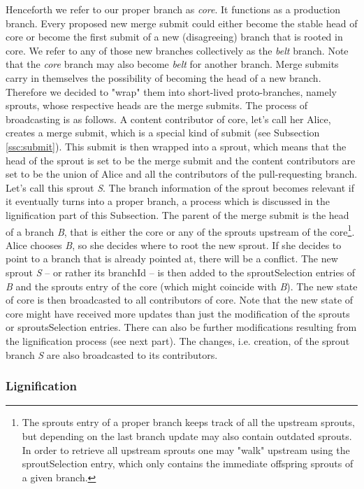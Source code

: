 Henceforth we refer to our proper branch as \textit{core}. It functions as a production branch. Every proposed new merge submit could either become the stable head of core or become the first submit of a new (disagreeing) branch that is rooted in core. We refer to any of those new branches collectively as the \textit{belt} branch. Note that the \textit{core} branch may also become \textit{belt} for another branch. Merge submits carry in themselves the possibility of becoming the head of a new branch. Therefore we decided to "wrap" them into short-lived proto-branches, namely sprouts, whose respective heads are the merge submits. The process of broadcasting is as follows. A content contributor of core, let's call her Alice, creates a merge submit, which is a special kind of submit (see Subsection \ref{ssc:submit}). This submit is then wrapped into a sprout, which means that the head of the sprout is set to be the merge submit and the content contributors are set to be the union of Alice and all the contributors of the pull-requesting branch. Let's call this sprout \textit{S}. The branch information of the sprout becomes relevant if it eventually turns into a proper branch, a process which is discussed in the lignification part of this Subsection. The parent of the merge submit is the head of a branch \textit{B}, that is either the core or any of the sprouts upstream of the core\footnote{The sprouts entry of a proper branch keeps track of all the upstream sprouts, but depending on the last branch update may also contain outdated sprouts. In order to retrieve all upstream sprouts one may "walk" upstream using the sproutSelection entry, which only contains the immediate offspring sprouts of a given branch.}. Alice chooses \textit{B}, so she decides where to root the new sprout. If she decides to point to a branch that is already pointed at, there will be a conflict. The new sprout \textit{S} -- or rather its branchId -- is then added to the sproutSelection entries of \textit{B} and the sprouts entry of the core (which might coincide with \textit{B}). The new state of core is then broadcasted to all contributors of core. Note that the new state of core might have received more updates than just the modification of the sprouts or sproutsSelection entries. There can also be further modifications resulting from the lignification process (see next part). The changes, i.e. creation, of the sprout branch \textit{S} are also broadcasted to its contributors. 

\subsubsection*{Lignification}

